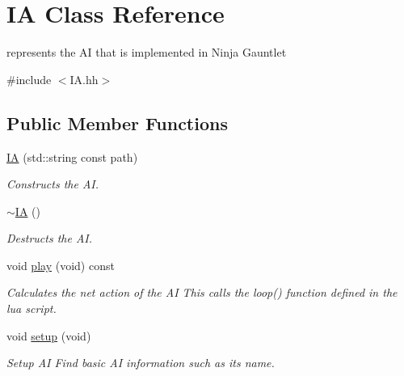 \hypertarget{class_i_a}{}\section{IA Class Reference}
\label{class_i_a}


represents the AI that is implemented in Ninja Gauntlet  




{\ttfamily \#include $<$I\+A.\+hh$>$}

\subsection*{Public Member Functions}
\begin{DoxyCompactItemize}
\item 
\hyperlink{class_i_a_a5ec5e30441ce9163caf40cbb763c18df}{IA} (std\+::string const path)
\begin{DoxyCompactList}\small\item\em Constructs the AI. \end{DoxyCompactList}\item 
\mbox{\label{class_i_a_a67d4dd285ae5169239348432bab9ad0e}} 
\hyperlink{class_i_a_a67d4dd285ae5169239348432bab9ad0e}{$\sim$\+IA} ()
\begin{DoxyCompactList}\small\item\em Destructs the AI. \end{DoxyCompactList}\item 
\mbox{\label{class_i_a_a81df51f46b3b30ff6bece457d094b3fc}} 
void \hyperlink{class_i_a_a81df51f46b3b30ff6bece457d094b3fc}{play} (void) const
\begin{DoxyCompactList}\small\item\em Calculates the net action of the AI This calls the loop() function defined in the lua script. \end{DoxyCompactList}\item 
\mbox{\label{class_i_a_af500668744c1eaa6345db6d062e463fc}} 
void \hyperlink{class_i_a_af500668744c1eaa6345db6d062e463fc}{setup} (void)
\begin{DoxyCompactList}\small\item\em Setup AI Find basic AI information such as its name. \end{DoxyCompactList}\end{DoxyCompactItemize}
